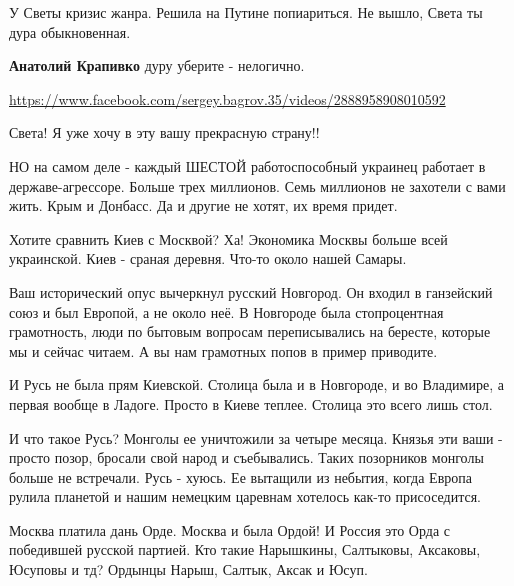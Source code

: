 \begin{itemize}
У Светы кризис жанра. Решила на Путине попиариться. Не вышло, Света ты дура
обыкновенная.

\begin{itemize}
 
\textbf{Анатолий Крапивко} дуру уберите - нелогично.
\end{itemize}

 

\Smiley[1.0][yellow] \url{https://www.facebook.com/sergey.bagrov.35/videos/2888958908010592}


Света! Я уже хочу в эту вашу прекрасную страну!!

НО на самом деле - каждый ШЕСТОЙ работоспособный украинец работает в
державе-агрессоре. Больше трех миллионов. Семь миллионов не захотели с вами
жить. Крым и Донбасс. Да и другие не хотят, их время придет.

Хотите сравнить Киев с Москвой? Ха! Экономика Москвы больше всей украинской.
Киев - сраная деревня. Что-то около нашей Самары.

Ваш исторический опус вычеркнул русский Новгород. Он входил в ганзейский союз и
был Европой, а не около неё. В Новгороде была стопроцентная грамотность, люди
по бытовым вопросам переписывались на бересте, которые мы и сейчас читаем. А вы
нам грамотных попов в пример приводите.

И Русь не была прям Киевской. Столица была и в Новгороде, и во Владимире, а
первая вообще в Ладоге. Просто в Киеве теплее. Столица это всего лишь стол.

И что такое Русь? Монголы ее уничтожили за четыре месяца. Князья эти ваши -
просто позор, бросали свой народ и съебывались. Таких позорников монголы больше
не встречали. Русь - хуюсь. Ее вытащили из небытия, когда Европа рулила
планетой и нашим немецким царевнам хотелось как-то присоседится.

Москва платила дань Орде. Москва и была Ордой! И Россия это Орда с победившей
русской партией. Кто такие Нарышкины, Салтыковы, Аксаковы, Юсуповы и тд?
Ордынцы Нарыш, Салтык, Аксак и Юсуп.


\end{itemize}
